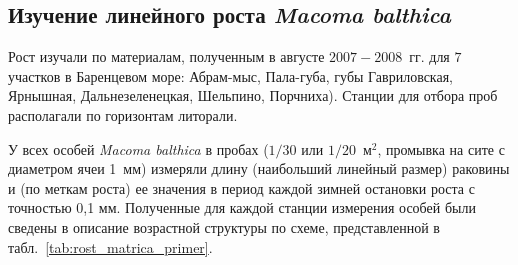 	\subsection{Изучение линейного роста {\it Macoma balthica}}
Рост изучали по материалам, полученным в августе $2007 - 2008$~гг. для $7$ участков в Баренцевом море: Абрам-мыс, Пала-губа, губы Гавриловская, Ярнышная, Дальнезеленецкая, Шельпино, Порчниха).
Станции для отбора проб располагали по горизонтам литорали. 

У всех особей {\it Macoma balthica} в пробах ($1/30$ или $1/20$~м$^2$, промывка на сите с диаметром ячеи 1~мм) измеряли длину (наибольший линейный размер) раковины и (по меткам роста) ее значения в период каждой зимней остановки роста с точностью 0,1 мм.
Полученные для каждой станции измерения особей были сведены в описание возрастной структуры по схеме, представленной в табл.~\ref{tab:rost_matrica_primer}. 
